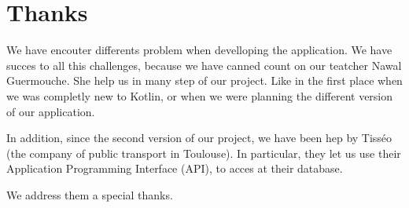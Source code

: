 \section{Thanks}

We have encouter differents problem when develloping the application. We have succes to all this challenges, because we have canned count on our teatcher Nawal Guermouche. She help us in many step of our project. Like in the first place when we was completly new to Kotlin, or when we were planning the different version of our application.


In addition, since the second version of our project, we have been hep by Tisséo (the company of public transport in Toulouse). In particular, they let us use their Application Programming Interface (API)\cite{tisseo}, to acces at their database.


We address them a special thanks.
